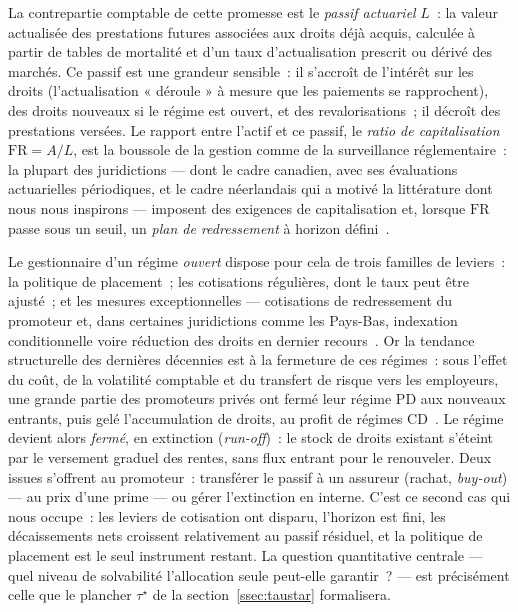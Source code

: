 \documentclass[11pt,letterpaper]{article}
\newcommand{\taustar}{\tau^{\star}}
\theoremstyle{definition}
\begin{document}
La contrepartie comptable de cette promesse est le \emph{passif actuariel}
$L$~: la valeur actualisée des prestations futures associées aux droits déjà
acquis, calculée à partir de tables de mortalité et d'un taux d'actualisation
prescrit ou dérivé des marchés. Ce passif est une grandeur sensible~: il
s'accroît de l'intérêt sur les droits (l'actualisation « déroule » à mesure que
les paiements se rapprochent), des droits nouveaux si le régime est ouvert, et
des revalorisations~; il décroît des prestations versées. Le rapport entre
l'actif et ce passif, le \emph{ratio de capitalisation} $\mathrm{FR} = A/L$,
est la boussole de la gestion comme de la surveillance réglementaire~: la
plupart des juridictions --- dont le cadre canadien, avec ses évaluations
actuarielles périodiques, et le cadre néerlandais qui a motivé la littérature
dont nous nous inspirons --- imposent des exigences de capitalisation et,
lorsque $\mathrm{FR}$ passe sous un seuil, un \emph{plan de redressement} à
horizon défini~\cite{KHSV2010}.

Le gestionnaire d'un régime \emph{ouvert} dispose pour cela de trois familles
de leviers~: la politique de placement~; les cotisations régulières, dont le
taux peut être ajusté~; et les mesures exceptionnelles --- cotisations de
redressement du promoteur et, dans certaines juridictions comme les Pays-Bas,
indexation conditionnelle voire réduction des droits en dernier
recours~\cite{KHSV2010}. Or la tendance structurelle des
dernières décennies est à la fermeture de ces régimes~: sous l'effet du coût,
de la volatilité comptable et du transfert de risque vers les employeurs, une
grande partie des promoteurs privés ont fermé leur régime PD aux nouveaux
entrants, puis gelé l'accumulation de droits, au profit de régimes
CD~\cite{Broadbent2006}. Le régime devient alors \emph{fermé}, en extinction
(\emph{run-off})~: le stock de droits existant s'éteint par le versement
graduel des rentes, sans flux entrant pour le renouveler. Deux issues
s'offrent au promoteur~: transférer le passif à un assureur (rachat,
\emph{buy-out}) --- au prix d'une prime --- ou gérer l'extinction en interne.
C'est ce second cas qui nous occupe~: les leviers de cotisation ont disparu,
l'horizon est fini, les décaissements nets croissent relativement au passif
résiduel, et la politique de placement est le seul instrument restant. La
question quantitative centrale --- quel niveau de solvabilité l'allocation
seule peut-elle garantir~? --- est précisément celle que le plancher
$\taustar$ de la section~\ref{ssec:taustar} formalisera.
\end{document}
